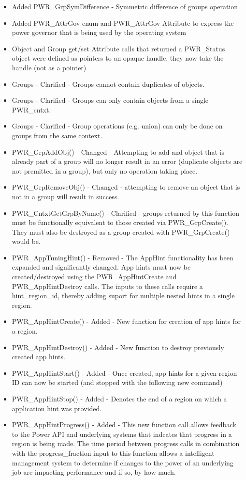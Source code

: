 \begin{itemize}
  \item{Added PWR_GrpSymDifference - Symmetric difference of groups operation}
  \item{Added PWR_AttrGov enum and PWR_AttrGov Attribute to express the power governor that is being used by the operating system}
  \item{Object and Group get/set Attribute calls that returned a PWR_Status object were defined as pointers to an opaque handle, they now take the handle (not as a pointer)}
  \item{Groups - Clarified - Groups cannot contain duplicates of objects.}
  \item{Groups - Clarified - Groups can only contain objects from a single PWR_cntxt.}
  \item{Groups - Clarified - Group operations (e.g. union) can only be done on groups from the same context.}
  \item{PWR_GrpAddObj() - Changed - Attempting to add and object that is already part of a group will no longer result in an error (duplicate objects are not premitted in a group), but only no operation taking place.}
  \item{PWR_GrpRemoveObj() - Changed - attempting to remove an object that is not in a group will result in success.}
  \item{PWR_CntxtGetGrpByName() - Clarified - groups returned by this function must be functionally equivalent to those created via PWR_GrpCreate(). They must also be destroyed as a group created with PWR_GrpCreate() would be.}
  \item{PWR_AppTuningHint() - Removed - The AppHint functionality has been expanded and significantly changed. App hints must now be created/destroyed using the PWR_AppHintCreate and PWR_AppHintDestroy calls. The inputs to these calls require a hint_region_id, thereby adding suport for multiple nested hints in a single region.}
  \item{PWR_AppHintCreate() - Added - New function for creation of app hints for a region.}
  \item{PWR_AppHintDestroy() - Added - New function to destroy previously created app hints.}
  \item{PWR_AppHintStart() - Added - Once created, app hints for a given region ID can now be started (and stopped with the following new command)}
  \item{PWR_AppHintStop() - Added - Denotes the end of a region on which a application hint was provided.}
  \item{PWR_AppHintProgress() - Added - This new function call allows feedback to the Power API and underlying systems that indcates that progress in a region is being made. The time period between progress calls in combination with the progress_fraction input to this function allows a intelligent management system to determine if changes to the power of an underlying job are impacting performance and if so, by how much.}

\end{itemize}


